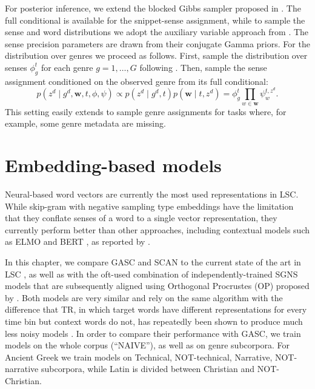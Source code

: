 \documentclass[output=paper]{langscibook}
\begin{document}
For posterior inference, we extend the blocked Gibbs sampler proposed in \citet{frermann-lapata-2016-bayesian}. The full conditional is available for the snippet-sense assignment, while  to  sample  the  sense and word distributions we adopt the auxiliary variable approach from \citet{mimno2008}. The sense precision parameters are drawn from their conjugate Gamma priors. For the distribution over genres we proceed as follows. First, sample the distribution over senses $\phi^t_g$ for each genre $g=1,\dots,G$ following \citet{mimno2008}. Then, sample the sense assignment conditioned on the observed genre from its full conditional:
\[p(z^d \mid g^d, \textbf{w}, t, \phi, \psi) \propto p(z^d \mid g^d, t) p( \textbf{w} \mid t, z^d) = \phi^t_{g} \prod_{w \in \textbf{w}} \psi^{t,z^d}_w.\]
This  setting easily extends to sample genre assignments for tasks where, for example, some genre metadata are missing.



\section{Embedding-based models}\largerpage
\label{sec:embedding}

Neural-based word vectors are currently the most used representations in LSC.
While skip-gram with negative sampling \citep[SGNS,][]{mikolov2013efficient} type embeddings have the limitation that they conflate senses of a word to a single vector representation, they currently perform better than other approaches, including contextual models such as ELMO \citep{peters-etal-2018-deep} and BERT \citep{devlin-etal-2019-bert}, as reported by \citet{schlechtweg-etal-2020-semeval}.

In this chapter, we compare GASC and SCAN to the current state of the art in LSC \citep[temporal referencing (TR),][]{dubossarsky-etal-2019-time}, as well as with the oft-used combination of independently-trained SGNS models that are subsequently aligned using Orthogonal Procrustes (OP) proposed by \citet{hamilton-etal-2016-diachronic}.
Both models are very similar and rely on the same algorithm with the difference that TR, in which target words have different representations for every time bin but context words do not, has repeatedly been shown to produce much less noisy models \citep[e.g. in][]{cassotti-etal-2020-gmctsc,zamora-reina-etal-2020-dcc-uchile}.
In order to compare their performance with GASC, we train models on the whole corpus (``NAIVE''), as well as on genre subcorpora. For Ancient Greek we train models on Technical, NOT-technical, Narrative, NOT-narrative subcorpora, while Latin is divided between Christian and NOT-Christian.
\end{document}
